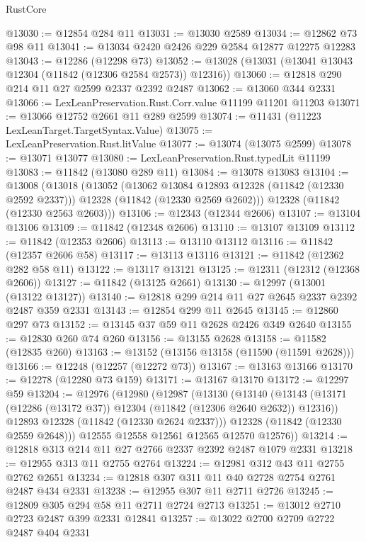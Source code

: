\begin{lexlean}{RustCore}
\begin{coremodule}
@13030 := @12854 @284 @11
@13031 := @13030 @2589
@13034 := @12862 @73 @98 @11
@13041 := @13034 @2420 @2426 @229 @2584 @12877 @12275 @12283
@13043 := @12286 (@12298 @73)
@13052 := @13028 (@13031 (@13041 @13043 @12304 (@11842 (@12306 @2584 @2573)) @12316))
@13060 := @12818 @290 @214 @11 @27 @2599 @2337 @2392 @2487
@13062 := @13060 @344 @2331
@13066 := LexLeanPreservation.Rust.Corr.value @11199 @11201 @11203
@13071 := @13066 @12752 @2661 @11 @289 @2599
@13074 := @11431 (@11223 LexLeanTarget.TargetSyntax.Value)
@13075 := LexLeanPreservation.Rust.litValue
@13077 := @13074 (@13075 @2599)
@13078 := @13071 @13077
@13080 := LexLeanPreservation.Rust.typedLit @11199
@13083 := @11842 (@13080 @289 @11)
@13084 := @13078 @13083
@13104 := @13008
    (@13018
      (@13052
        (@13062 @13084 @12893 @12328 (@11842 (@12330 @2592 @2337)))
        @12328
        (@11842 (@12330 @2569 @2602)))
      @12328
      (@11842 (@12330 @2563 @2603)))
@13106 := @12343 (@12344 @2606)
@13107 := @13104 @13106
@13109 := @11842 (@12348 @2606)
@13110 := @13107 @13109
@13112 := @11842 (@12353 @2606)
@13113 := @13110 @13112
@13116 := @11842 (@12357 @2606 @58)
@13117 := @13113 @13116
@13121 := @11842 (@12362 @282 @58 @11)
@13122 := @13117 @13121
@13125 := @12311 (@12312 (@12368 @2606))
@13127 := @11842 (@13125 @2661)
@13130 := @12997 (@13001 (@13122 @13127))
@13140 := @12818 @299 @214 @11 @27 @2645 @2337 @2392 @2487 @359 @2331
@13143 := @12854 @299 @11 @2645
@13145 := @12860 @297 @73
@13152 := @13145 @37 @59 @11 @2628 @2426 @349 @2640
@13155 := @12830 @260 @74 @260
@13156 := @13155 @2628
@13158 := @11582 (@12835 @260)
@13163 := @13152 (@13156 @13158 (@11590 (@11591 @2628)))
@13166 := @12248 (@12257 (@12272 @73))
@13167 := @13163 @13166
@13170 := @12278 (@12280 @73 @159)
@13171 := @13167 @13170
@13172 := @12297 @59
@13204 := @12976
    (@12980
      (@12987
        (@13130
          (@13140
            (@13143 (@13171 (@12286 (@13172 @37)) @12304 (@11842 (@12306 @2640 @2632)) @12316))
            @12893
            @12328
            (@11842 (@12330 @2624 @2337)))
          @12328
          (@11842 (@12330 @2559 @2648)))
        @12555
        @12558
        @12561
        @12565
        @12570
        @12576))
@13214 := @12818 @313 @214 @11 @27 @2766 @2337 @2392 @2487 @1079 @2331
@13218 := @12955 @313 @11 @2755 @2764
@13224 := @12981 @312 @43 @11 @2755 @2762 @2651
@13234 := @12818 @307 @311 @11 @40 @2728 @2754 @2761 @2487 @434 @2331
@13238 := @12955 @307 @11 @2711 @2726
@13245 := @12809 @305 @294 @58 @11 @2711 @2724 @2713
@13251 := @13012 @2710 @2723 @2487 @399 @2331 @12841
@13257 := @13022 @2700 @2709 @2722 @2487 @404 @2331

\end{coremodule}
\end{lexlean}
